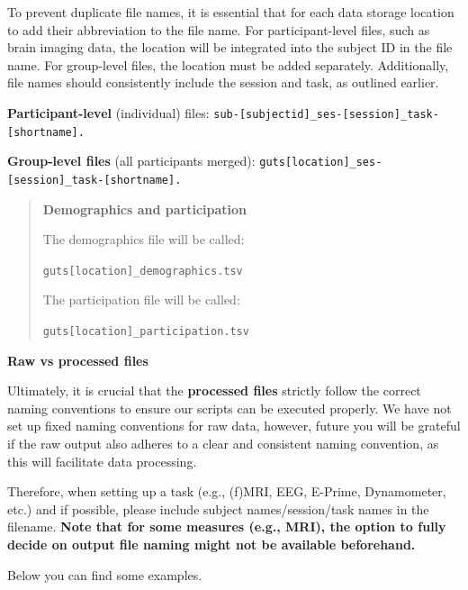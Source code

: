 \documentclass[
  letterpaper,
  DIV=11,
  numbers=noendperiod]{scrreprt}
\begin{document}
\begin{tcolorbox}[enhanced jigsaw, arc=.35mm, left=2mm, colbacktitle=quarto-callout-tip-color!10!white, bottomtitle=1mm, toptitle=1mm, titlerule=0mm, leftrule=.75mm, breakable, colframe=quarto-callout-tip-color-frame, colback=white, opacitybacktitle=0.6, coltitle=black, opacityback=0, rightrule=.15mm, toprule=.15mm, bottomrule=.15mm, title={File names}]

To prevent duplicate file names, it is essential that for each data
storage location to add their abbreviation to the file name. For
participant-level files, such as brain imaging data, the location will
be integrated into the subject ID in the file name. For group-level
files, the location must be added separately. Additionally, file names
should consistently include the session and task, as outlined earlier.

\textbf{Participant-level} (individual) files:
\texttt{sub-{[}subjectid{]}\_ses-{[}session{]}\_task-{[}shortname{]}.}

\textbf{Group-level files} (all participants merged):
\texttt{guts{[}location{]}\_ses-{[}session{]}\_task-{[}shortname{]}.}

\begin{quote}
\textbf{Demographics and participation}

The demographics file will be called:

\texttt{guts{[}location{]}\_demographics.tsv}

The participation file will be called:

\texttt{guts{[}location{]}\_participation.tsv}
\end{quote}

\textbf{Raw vs processed files}

Ultimately, it is crucial that the \textbf{processed files} strictly
follow the correct naming conventions to ensure our scripts can be
executed properly. We have not set up fixed naming conventions for raw
data, however, future you will be grateful if the raw output also
adheres to a clear and consistent naming convention, as this will
facilitate data processing.

Therefore, when setting up a task (e.g., (f)MRI, EEG, E-Prime,
Dynamometer, etc.) and if possible, please include subject
names/session/task names in the filename. \textbf{Note that for some
measures (e.g., MRI), the option to fully decide on output file naming
might not be available beforehand.}

Below you can find some examples.


\end{tcolorbox}
\end{document}
